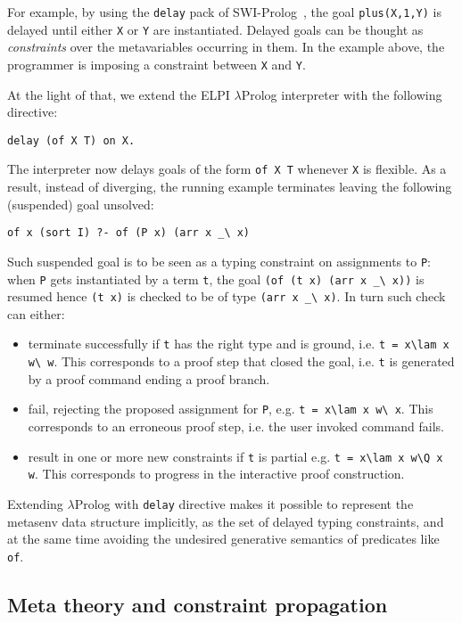 \documentclass{easychair}
\begin{document}
For example, by using the \verb+delay+ pack of SWI-Prolog~\cite{SWI}, the goal
\verb+plus(X,1,Y)+ is delayed until either \verb+X+ or \verb+Y+ are
instantiated.  Delayed goals can be thought as \emph{constraints} over the
metavariables occurring in them. In the example above, the programmer is
imposing a constraint between \verb+X+ and \verb+Y+.

At the light of that, we extend the ELPI $\lambda$Prolog interpreter
with the following directive:

\begin{verbatim}
delay (of X T) on X.
\end{verbatim}

The interpreter now delays goals of the form \verb+of X T+ whenever \verb+X+
is flexible.  As a result, instead of diverging, the running example
terminates leaving the following (suspended) goal unsolved:

\begin{verbatim}
of x (sort I) ?- of (P x) (arr x _\ x)
\end{verbatim}

Such suspended goal is to be seen as a typing constraint on
assignments to \verb+P+: when \verb+P+ gets instantiated by a
term \verb+t+, the goal \verb+(of (t x) (arr x _\ x))+ is resumed
hence \verb+(t x)+ is checked to be of type \verb+(arr x _\ x)+.
In turn such check can either:
\begin{itemize}
\item terminate successfully if \verb+t+ has the right type and is ground,
	i.e. \verb+t = x\lam x w\ w+.  This corresponds to a proof step
	that closed the goal, i.e. \verb+t+ is generated by a
	proof command ending a proof branch.
\item fail, rejecting the proposed assignment for \verb+P+, e.g. 
	\verb+t = x\lam x w\ x+.  This corresponds to an erroneous proof step,
	i.e. the user invoked command fails.
\item result in one or more new constraints if \verb+t+ is partial
	e.g. \verb+t = x\lam x w\Q x w+.  This corresponds to progress
	in the interactive proof construction.
\end{itemize}

Extending $\lambda$Prolog with \verb+delay+
directive makes it possible to represent
the metasenv data structure implicitly, as the set of delayed typing
constraints, and at the same time
avoiding the undesired generative semantics of predicates like \verb+of+.

\subsection{Meta theory and constraint propagation} %
\end{document}

